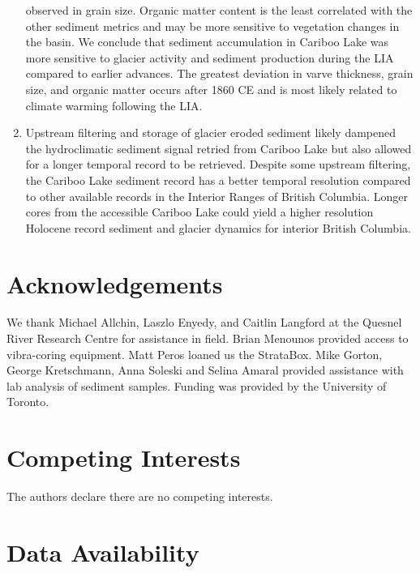 \documentclass[
  letterpaper,
  DIV=11,
  numbers=noendperiod]{scrartcl}
\begin{document}
\begin{enumerate}
  observed in grain size. Organic matter content is the least correlated
  with the other sediment metrics and may be more sensitive to
  vegetation changes in the basin. We conclude that sediment
  accumulation in Cariboo Lake was more sensitive to glacier activity
  and sediment production during the LIA compared to earlier advances.
  The greatest deviation in varve thickness, grain size, and organic
  matter occurs after 1860 CE and is most likely related to climate
  warming following the LIA.
\item
  Upstream filtering and storage of glacier eroded sediment likely
  dampened the hydroclimatic sediment signal retried from Cariboo Lake
  but also allowed for a longer temporal record to be retrieved. Despite
  some upstream filtering, the Cariboo Lake sediment record has a better
  temporal resolution compared to other available records in the
  Interior Ranges of British Columbia. Longer cores from the accessible
  Cariboo Lake could yield a higher resolution Holocene record sediment
  and glacier dynamics for interior British Columbia.
\end{enumerate}

\pagebreak

\hypertarget{acknowledgements}{%
\section{Acknowledgements}\label{acknowledgements}}

We thank Michael Allchin, Laszlo Enyedy, and Caitlin Langford at the
Quesnel River Research Centre for assistance in field. Brian Menounos
provided access to vibra-coring equipment. Matt Peros loaned us the
StrataBox. Mike Gorton, George Kretschmann, Anna Soleski and Selina
Amaral provided assistance with lab analysis of sediment samples.
Funding was provided by the University of Toronto.

\hypertarget{competing-interests}{%
\section{Competing Interests}\label{competing-interests}}

The authors declare there are no competing interests.

\hypertarget{data-availability}{%
\section{Data Availability}\label{data-availability}}
\end{document}
